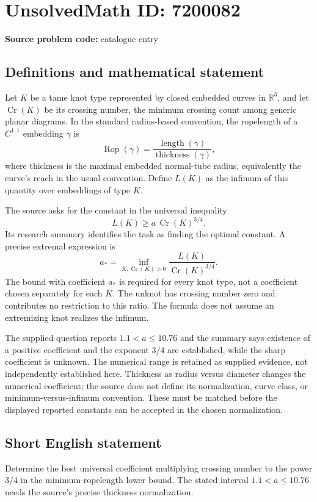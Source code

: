 \documentclass[11pt]{article}
\newcommand{\R}{\mathbb{R}}
\begin{document}
\section*{UnsolvedMath ID: 7200082}
\textbf{Source problem code:} catalogue entry
\subsection{Definitions and mathematical statement}
Let $K$ be a tame knot type represented by closed embedded curves in $\R^3$, and let $\operatorname{Cr}(K)$ be its crossing number, the minimum crossing count among generic planar diagrams. In the standard radius-based convention, the ropelength of a $C^{1,1}$ embedding $\gamma$ is
\[
 \operatorname{Rop}(\gamma)=
       \frac{\operatorname{length}(\gamma)}{\operatorname{thickness}(\gamma)},
\]
where thickness is the maximal embedded normal-tube radius, equivalently the curve's reach in the usual convention. Define $L(K)$ as the infimum of this quantity over embeddings of type $K$.

The source asks for the constant in the universal inequality
\[
 L(K)\ge a\,\operatorname{Cr}(K)^{3/4}.
\]
Its research summary identifies the task as finding the optimal constant. A precise extremal expression is
\[
 a_* =\inf_{K:\operatorname{Cr}(K)>0}
       \frac{L(K)}{\operatorname{Cr}(K)^{3/4}}.
\]
The bound with coefficient $a_*$ is required for every knot type, not a coefficient chosen separately for each $K$. The unknot has crossing number zero and contributes no restriction to this ratio. The formula does not assume an extremizing knot realizes the infimum.

The supplied question reports $1.1<a\le10.76$ and the summary says existence of a positive coefficient and the exponent $3/4$ are established, while the sharp coefficient is unknown. The numerical range is retained as supplied evidence, not independently established here. Thickness as radius versus diameter changes the numerical coefficient; the source does not define its normalization, curve class, or minimum-versus-infimum convention. These must be matched before the displayed reported constants can be accepted in the chosen normalization.
\subsection{Short English statement}
Determine the best universal coefficient multiplying crossing number to the power $3/4$ in the minimum-ropelength lower bound. The stated interval $1.1<a\le10.76$ needs the source's precise thickness normalization.
\end{document}
